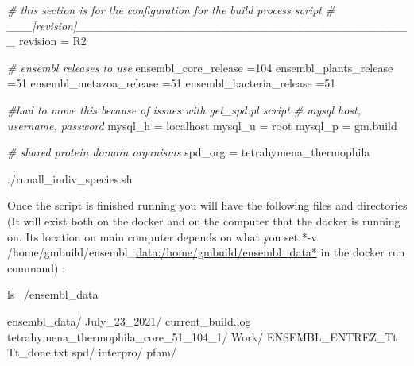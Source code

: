 \documentclass[]{book}
\newenvironment{Shaded}{\begin{snugshade}}{\end{snugshade}}
\newcommand{\CommentTok}[1]{\textcolor[rgb]{0.56,0.35,0.01}{\textit{#1}}}
\newcommand{\FunctionTok}[1]{\textcolor[rgb]{0.00,0.00,0.00}{#1}}
\newcommand{\ExtensionTok}[1]{#1}
\newcommand{\NormalTok}[1]{#1}
\begin{document}
\begin{Shaded}
\begin{Highlighting}[]
\NormalTok{[}\ExtensionTok{BuildScriptsConfig}\NormalTok{]}
\CommentTok{# this section is for the configuration for the build process script}
\CommentTok{# ___[revision]_________________________________________}
\ExtensionTok{revision}\NormalTok{ = R2}

\CommentTok{# ensembl releases to use}
\ExtensionTok{ensembl_core_release}\NormalTok{ =104}
\ExtensionTok{ensembl_plants_release}\NormalTok{ =51}
\ExtensionTok{ensembl_metazoa_release}\NormalTok{ =51}
\ExtensionTok{ensembl_bacteria_release}\NormalTok{ =51}

\CommentTok{#had to move this because of issues with get_spd.pl script}
\CommentTok{# mysql host, username, password}
\ExtensionTok{mysql_h}\NormalTok{ = localhost}
\ExtensionTok{mysql_u}\NormalTok{ = root}
\ExtensionTok{mysql_p}\NormalTok{ = gm.build}

\CommentTok{# shared protein domain organisms}
\ExtensionTok{spd_org}\NormalTok{ = tetrahymena_thermophila}
\end{Highlighting}
\end{Shaded}

\begin{Shaded}
\begin{Highlighting}[]
\ExtensionTok{./runall_indiv_species.sh}
\end{Highlighting}
\end{Shaded}

Once the script is finished running you will have the following files
and directories (It will exist both on the docker and on the computer
that the docker is running on. Its location on main computer depends on
what you set *-v
/home/gmbuild/ensembl\_\url{data:/home/gmbuild/ensembl_data*} in the
docker run command) :

\begin{Shaded}
\begin{Highlighting}[]
\FunctionTok{ls}\NormalTok{ ~/ensembl_data}

\ExtensionTok{ensembl_data/}
  \ExtensionTok{July_23_2021/}
    \ExtensionTok{current_build.log}  
    \ExtensionTok{tetrahymena_thermophila_core_51_104_1/}
    \ExtensionTok{Work/}  
      \ExtensionTok{ENSEMBL_ENTREZ_Tt}  
      \ExtensionTok{Tt_done.txt}   
      \ExtensionTok{spd/}
        \ExtensionTok{interpro/}
        \ExtensionTok{pfam/}
\end{Highlighting}
\end{Shaded}
\end{document}
